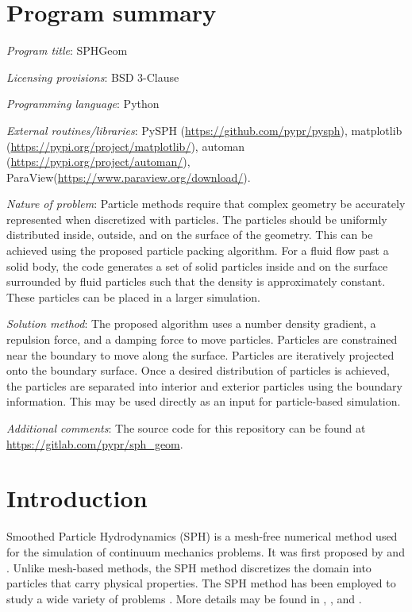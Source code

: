 \documentclass[preprint,12pt]{elsarticle}
\begin{document}
\section*{Program summary}
\noindent
\textit{Program title}: SPHGeom

\noindent
\textit{Licensing provisions}: BSD 3-Clause

\noindent
\textit{Programming language}: Python

\begin{sloppypar}
  \noindent
  \textit{External routines/libraries}: PySPH
  (\url{https://github.com/pypr/pysph}), matplotlib
  (\url{https://pypi.org/project/matplotlib/}), automan
  (\url{https://pypi.org/project/automan/}),
  ParaView(\url{https://www.paraview.org/download/}).
\end{sloppypar}
\noindent
\textit{Nature of problem}: Particle methods require that complex geometry be
accurately represented when discretized with particles. The particles should
be uniformly distributed inside, outside, and on the surface of the geometry.
This can be achieved using the proposed particle packing algorithm. For a
fluid flow past a solid body, the code generates a set of solid particles
inside and on the surface surrounded by fluid particles such that the density
is approximately constant. These particles can be placed in a larger simulation.

\noindent
\textit{Solution method}: The proposed algorithm uses a number density
gradient, a repulsion force, and a damping force to move particles. Particles
are constrained near the boundary to move along the surface. Particles are
iteratively projected onto the boundary surface. Once a desired distribution
of particles is achieved, the particles are separated into interior and
exterior particles using the boundary information. This may be used directly
as an input for particle-based simulation.

\noindent
\textit{Additional comments}: The source code for this repository can be found at
\url{https://gitlab.com/pypr/sph_geom}.


\section{Introduction}
\label{sec:intro}

Smoothed Particle Hydrodynamics (SPH) is a mesh-free numerical method used
for the simulation of continuum mechanics problems. It was first proposed by
\citet{monaghan-gingold-stars-mnras-77} and \citet{lucy77}. Unlike mesh-based
methods, the SPH method discretizes the domain into particles that carry
physical properties. The SPH method has been employed to study a wide variety
of problems
\cite{puri_approximate_2014,zhang_generalized_2017,muta_efficient_2020,sun_accurate_2021}.
More details may be found in \citet{liu_smoothed_2010},
\citet{violeau_book_2012}, and \citet{ye2019smoothed}.
\end{document}
